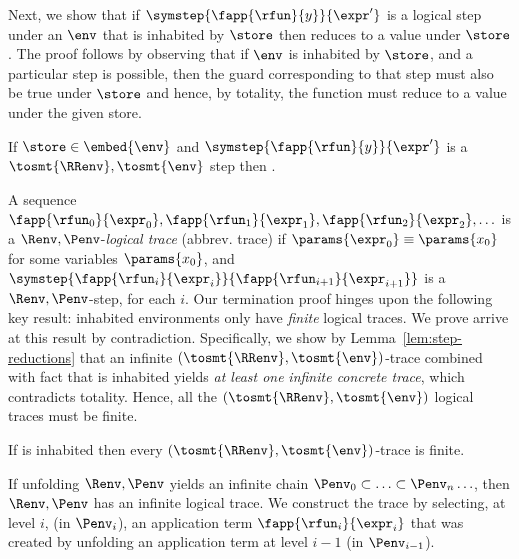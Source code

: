 %
Next, we show that if
$\symstep{\fapp{\rfun}{y}}{\expr'}$
is a logical step under an $\env$
that is inhabited by $\store$
then  reduces
to a value under $\store$.
%
The proof follows by observing
that if $\env$ is inhabited by
$\store$, and a particular step
is possible, then the guard
corresponding to that step
must also be true under
$\store$ and hence, by totality,
the function must reduce to
a value under the given store.


\begin{lemma}\label{lem:step-value}
If   $\store \in \embed{\env}$
     and
     $\symstep{\fapp{\rfun}{y}}{\expr'}$
	   is a $\tosmt{\RRenv}, \tosmt{\env}$ step
then .
\end{lemma}

%
A sequence
%
$\fapp{\rfun_0}{\expr_0},\fapp{\rfun_1}{\expr_1},\fapp{\rfun_2}{\expr_2},\ldots$
%
is a $\Renv,\Penv$-\emph{logical trace} (abbrev. trace)
if $\params{\expr_0} \equiv \params{x_0}$ for some variables $\params{x_0}$,
and $\symstep{\fapp{\rfun_i}{\expr_i}}{\fapp{\rfun_{i+1}}{\expr_{i+1}}}$
is a $\Renv,\Penv$-step, for each $i$.
%
Our termination proof hinges upon the following
key result: inhabited environments only have
\emph{finite} logical traces.
%
We prove arrive at this result by contradiction.
%
Specifically, we show by Lemma~\ref{lem:step-reductions}
that an infinite $(\tosmt{\RRenv},\tosmt{\env})$-trace
combined with fact that \env is inhabited
yields \textit{at least one}
\emph{infinite concrete trace},
which contradicts totality.
%
Hence, all the $(\tosmt{\RRenv},\tosmt{\env})$
logical traces must be finite.

\begin{theorem}\label{thm:finite-trace}
If %
   \env is inhabited
then every $(\tosmt{\RRenv},\tosmt{\env})$-trace is finite.
\end{theorem}

%
If unfolding $\Renv, \Penv$ yields
an infinite chain $\Penv_0 \subset \ldots \subset \Penv_n \ldots$,
then $\Renv, \Penv$ has an infinite logical trace.
%
We construct the trace
by selecting, at level $i$,
(\ie in $\Penv_i$),
an application term
$\fapp{\rfun_i}{\expr_i}$
that was created by
unfolding an application
term at level $i-1$
(\ie in $\Penv_{i-1}$).

